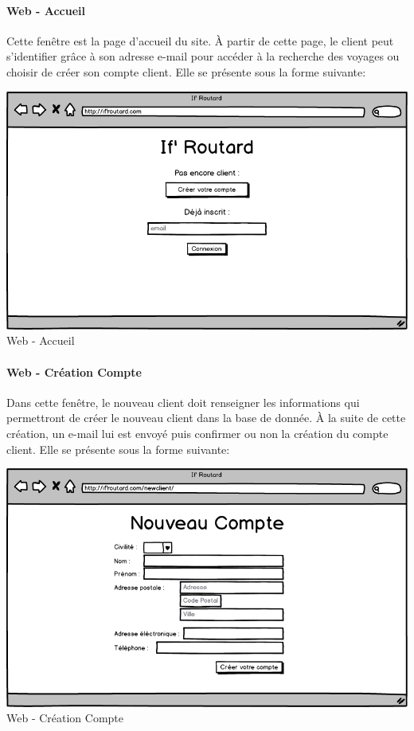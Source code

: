 \documentclass[12pt]{article}
\begin{document}
\paragraph{Web - Accueil}
Cette fenêtre est la page d'accueil du site. À partir de cette page, le client peut s'identifier grâce à son adresse e-mail pour accéder à la recherche des voyages ou choisir de créer son compte client. Elle se présente sous la forme suivante: 
\begin{center}
\includegraphics[scale = 0.4]{../Conception_graphique/png_Pour_CR/Web-00-Accueil.png}
\newline
Web - Accueil
\label{fig:Web-Accueil}
\end{center}

\paragraph{Web - Création Compte}
Dans cette fenêtre, le nouveau client doit renseigner les informations qui permettront de créer le nouveau client dans la base de donnée. À la suite de cette création, un e-mail lui est envoyé puis confirmer ou non la création du compte client. Elle se présente sous la forme suivante:
\begin{center}
\includegraphics[scale = 0.4]{../Conception_graphique/png_Pour_CR/Web-10-Creation_Compte.png}
\newline
Web - Création Compte
\label{fig:Creation-Compte}
\end{center}
\end{document}
